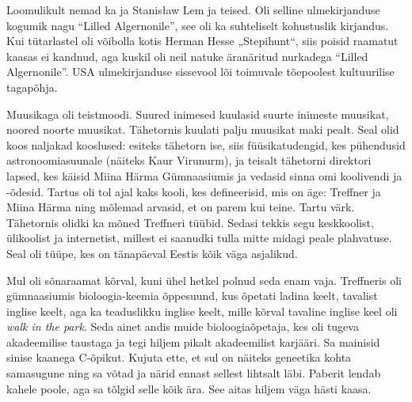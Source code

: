 Loomulikult nemad ka ja Stanisław Lem ja teised. Oli selline ulmekirjanduse kogumik nagu \enquote{Lilled 
Algernonile}, see oli ka suhteliselt kohustuslik kirjandus. Kui 
tütarlastel oli võibolla kotis Herman Hesse „Stepihunt“, siis poisid raamatut 
kaasas ei kandnud, aga kuskil oli neil natuke äranäritud nurkadega \enquote{Lilled 
Algernonile}. USA ulmekirjanduse sissevool lõi toimuvale tõepoolest 
kultuurilise tagapõhja.

Muusikaga oli teistmoodi. Suured inimesed kuulasid suurte inimeste 
muusikat, noored noorte muusikat. Tähetornis 
kuulati palju muusikat maki pealt. Seal olid koos naljakad 
kooslused: esiteks tähetorn ise, siis 
füüsikatudengid, kes pühendusid astronoomiasuunale (näiteks Kaur 
Virunurm), ja teisalt tähetorni 
direktori lapsed, kes käisid Miina Härma 
Gümnaasiumis ja vedasid sinna 
omi koolivendi ja -õdesid. 
Tartus oli tol ajal kaks kooli, kes defineerisid, mis on äge: 
Treffner ja Miina Härma ning mõlemad 
arvasid, et on parem kui teine. Tartu värk. Tähetornis olidki 
ka mõned Treffneri tüübid. Sedasi tekkis segu keskkoolist, 
ülikoolist ja internetist, millest ei saanudki tulla mitte midagi peale plahvatuse. Seal oli tüüpe, kes on tänapäeval Eestis kõik
väga asjalikud.


Mul oli sõnaraamat kõrval, kuni ühel hetkel polnud seda
enam vaja. Treffneris 
oli gümnaasiumis bioloogia-keemia õppesuund, kus õpetati ladina keelt, 
tavalist inglise keelt, aga ka teaduslikku inglise keelt, mille 
kõrval tavaline inglise keel oli \emph{walk in the park}. Seda ainet andis 
muide bioloogiaõpetaja, kes oli tugeva akadeemilise taustaga ja 
tegi hiljem pikalt akadeemilist karjääri. Sa 
mainisid sinise kaanega C-õpikut. Kujuta ette, et sul on näiteks geneetika 
kohta samasugune ning sa võtad ja närid ennast sellest lihtsalt läbi. Paberit lendab 
kahele poole, aga sa tõlgid selle kõik ära. See aitas hiljem väga hästi kaasa.

